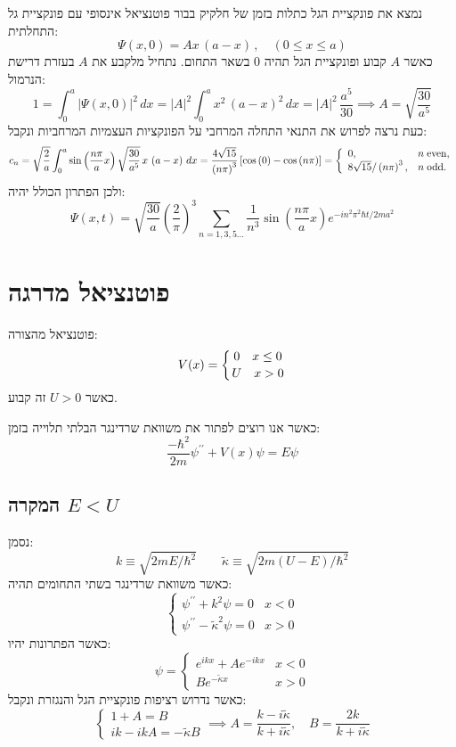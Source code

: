 \documentclass{tstextbook}
\begin{document}
\begin{example}
נמצא את פונקציית הגל כתלות בזמן של חלקיק בבור פוטנציאל אינסופי עם פונקציית גל התחלתית:
$$\Psi(x,0)=A x\,(a-x)\,,\quad(0\le x\le a)$$
כאשר \(A\) קבוע ופונקציית הגל תהיה 0 בשאר התחום.
נתחיל מלקבע את \(A\) בעזרת דרישת הנרמול:
$$1=\int_{0}^{a}|\Psi(x,0)|^{2}\,d x=|A|^{2}\int_{0}^{a}x^{2}\,(a-x)^{2}\,d x=|A|^{2}\,{\frac{a^{5}}{30}}\implies A=\sqrt{ \frac{30}{a^{5}} }$$
כעת נרצה לפרוש את התנאי התחלה המרחבי על הפונקציות העצמיות המרחביות ונקבל:
\begin{gather*}c_{n}=\sqrt{\frac{2}{a}}\int_{0}^{a}\sin\left(\frac{n\pi}{a}x\right)\sqrt{\frac{30}{a^{5}}}\,x\,\left(a-x\right)\,d x =\frac{4\sqrt{15}}{\left(n\pi\right)^{3}}\left[\cos\left(0\right)-\cos\left(n\pi\right)\right]=\left\{\begin{array}{l l}{{0,}}&{{n\;\mathrm{even},}}\\ {{8\sqrt{15}/\left(n\pi\right)^{3},}}&{{n\;\mathrm{odd}.}}\end{array}\right.
\end{gather*}
ולכן הפתרון הכולל יהיה:
$$\Psi(x,t)={\sqrt{\frac{30}{a}}}\left({\frac{2}{\pi}}\right)^{3}\sum_{n=1,3,5\ldots}{\frac{1}{n^{3}}}\sin\left({\frac{n\pi}{a}}x\right)e^{-i n^{2}\pi^{2}\hbar t/2m a^{2}}$$

\end{example}
\section{פוטנציאל מדרגה}

\begin{definition}
פוטנציאל מהצורה:
$$V(x)=\left\{{0\quad x\leq0}\atop{U\quad x>0}\right.$$
כאשר \(U>0\) זה קבוע.

\end{definition}
כאשר אנו רוצים לפתור את משוואת שרדינגר הבלתי תלוייה בזמן:
$${\frac{-\hbar^{2}}{2m}}\psi^{\prime\prime}+V(x)\psi=E\psi$$

\subsection{המקרה \(E<U\)}

נסמן:
$$k\equiv\sqrt{2m E/\hbar^{2}} \qquad \tilde{\kappa}\equiv\sqrt{2m(U-E)/\hbar^{2}}$$
כאשר משוואת שרדינגר בשתי התחומים תהיה:
$$\begin{cases}\psi^{\prime\prime}+k^{2}\psi=0 &x<0 \\\psi^{\prime\prime}-\tilde{\kappa}^{2}\psi=0 &x>0
\end{cases}$$
כאשר הפתרונות יהיו:
$$\psi=\begin{cases}e^{ ikx }+Ae^{ -ikx } & x<0 \\Be^{ -\tilde{\kappa}x } & x>0
\end{cases}$$
כאשר נדרוש רציפות פונקציית הגל והנגזרת ונקבל:
$$\begin{cases}1+A=B \\ik-ikA=-\tilde{\kappa}B
\end{cases}\implies A=\frac{k-i\tilde{\kappa}}{k+i\tilde{\kappa}},\quad B=\frac{2k}{k+i\tilde{\kappa}}$$
\end{document}
